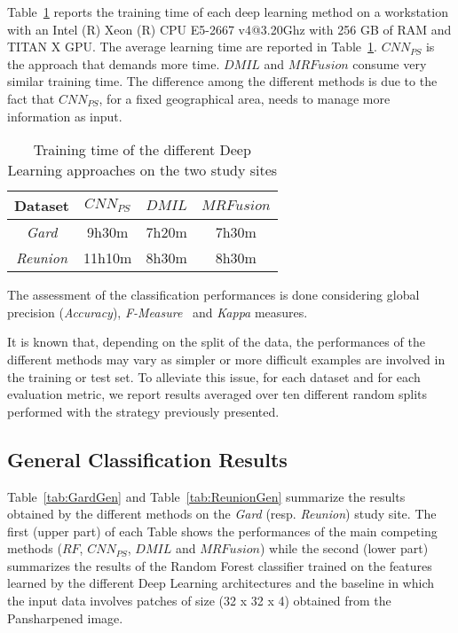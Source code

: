 \documentclass[journal]{IEEEtran}
\newcommand{\method}{$MRFusion$}
\begin{document}
Table~\ref{tab:TrainingTime} reports the training time of each deep learning method on a workstation with an Intel (R) Xeon (R) CPU E5-2667 v4@3.20Ghz with 256 GB of RAM and TITAN X GPU. The average learning time are reported in Table~\ref{tab:TrainingTime}. $CNN_{PS}$ is the approach that demands more time. $DMIL$ and \method{} consume very similar training time. The difference among the different methods is due to the fact that $CNN_{PS}$, for a fixed geographical area, needs to manage more information as input.

\begin{table}[!ht]
\centering
\scriptsize
\begin{tabular}{cccc}
Dataset & $CNN_{PS}$ & $DMIL$ & \method{} \\ \hline \hline
\textit{Gard} & 9h30m & 7h20m & 7h30m \\ \hline
\textit{Reunion} & 11h10m & 8h30m & 8h30m \\ \hline
\end{tabular}
\caption{Training time of the different Deep Learning approaches on the two study sites \label{tab:TrainingTime}}
\end{table}The assessment of the classification performances is done considering global precision (\textit{Accuracy}), \textit{F-Measure}~\cite{IencoGDM17} and \textit{Kappa} measures.

It is known that, depending on the split of the data, the performances of the different methods may vary as simpler or more difficult examples are involved in the training or test set. To alleviate this issue, for each dataset and for each evaluation metric, we report results averaged over ten different random splits performed with the strategy previously presented.

\subsection{General Classification Results}
Table~\ref{tab:GardGen} and Table~\ref{tab:ReunionGen} summarize the results obtained by the different methods on the \textit{Gard} (resp. \textit{Reunion}) study site. The first (upper part) of each Table shows the performances of the main competing methods ($RF$, $CNN_{PS}$, $DMIL$ and \method{}) while the second (lower part) summarizes the results of the Random Forest classifier trained on the features learned by the different Deep Learning architectures and the baseline in which the input data involves patches of size (32 x 32 x 4) obtained from the Pansharpened image.
\end{document}

